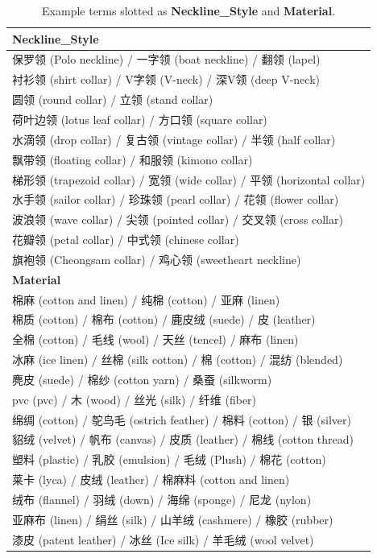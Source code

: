 \begin{table}[h]
	\centering
	\small
	\caption{Example terms slotted as \textbf{Neckline\_Style} and \textbf{Material}.}
	\begin{tabular}{|l|}
		\hline
			\large{\textbf{Neckline\_Style}} \\
		\hline
			保罗领 (Polo neckline) / 一字领 (boat neckline) / 翻领 (lapel)\\
			衬衫领 (shirt collar) / V字领 (V-neck) / 深V领 (deep V-neck) \\
			圆领 (round collar) / 立领 (stand collar)  \\
			荷叶边领 (lotus leaf collar) / 方口领 (square collar) \\
			水滴领 (drop collar) / 复古领 (vintage collar) / 半领 (half collar) \\
			飘带领 (floating collar) / 和服领 (kimono collar) \\
			梯形领 (trapezoid collar) / 宽领 (wide collar) / 平领 (horizontal collar) \\
			水手领 (sailor collar) / 珍珠领 (pearl collar) / 花领 (flower collar) \\
			波浪领 (wave collar) / 尖领 (pointed collar) / 交叉领 (cross collar) \\
			花瓣领 (petal collar) / 中式领 (chinese collar) \\
			旗袍领 (Cheongsam collar) / 鸡心领 (sweetheart neckline)  \\
		\hline
		\hline
			\large{\textbf{Material}} \\
		\hline
			棉麻 (cotton and linen) / 纯棉 (cotton) / 亚麻 (linen) \\
			棉质 (cotton) / 棉布 (cotton) / 鹿皮绒 (suede) / 皮 (leather) \\
			全棉 (cotton) / 毛线 (wool) / 天丝 (tencel) / 麻布 (linen) \\
			冰麻 (ice linen) / 丝棉 (silk cotton) / 棉 (cotton) / 混纺 (blended) \\
			麂皮 (suede) / 棉纱 (cotton yarn) / 桑蚕 (silkworm)  \\
			pvc (pvc) / 木 (wood) / 丝光 (silk) / 纤维 (fiber) \\
			绵绸 (cotton) / 鸵鸟毛 (ostrich feather) / 棉料 (cotton) / 银 (silver) \\
			貂绒 (velvet) / 帆布 (canvas) / 皮质 (leather) / 棉线 (cotton thread) \\
			塑料 (plastic) / 乳胶 (emulsion) / 毛绒 (Plush) / 棉花 (cotton) \\
			莱卡 (lyca) / 皮绒 (leather) / 棉麻料 (cotton and linen) \\
			绒布 (flannel) / 羽绒 (down) / 海绵 (sponge) / 尼龙 (nylon) \\
			亚麻布 (linen) / 绢丝 (silk) / 山羊绒 (cashmere) / 橡胶 (rubber) \\
			漆皮 (patent leather) / 冰丝 (Ice silk) / 羊毛绒 (wool velvet) \\
		\hline
	\end{tabular}
	\label{tab:show_case}
\end{table}

